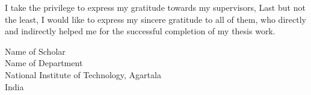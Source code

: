 I take the privilege to express my  gratitude towards
my supervisors, 
\indent Last but not the least, I would like to express my sincere 
gratitude to all of them, who directly and indirectly helped me for the 
successful completion of my thesis work. \\ 
\vspace {5mm}
\begin{flushright}
Name of Scholar \\
Name of Department \\
National Institute of Technology, Agartala \\
India \\
\end{flushright}
